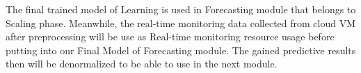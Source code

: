 \documentclass[runningheads]{llncs}
\begin{document}
The final trained model of Learning is used in Forecasting module that belongs to Scaling phase. Meanwhile, the real-time monitoring data collected from cloud VM after preprocessing will be use as Real-time monitoring resource usage before putting into our Final Model of Forecasting module. The gained predictive results then will be denormalized to be able to use in the next module.

\end{document}
